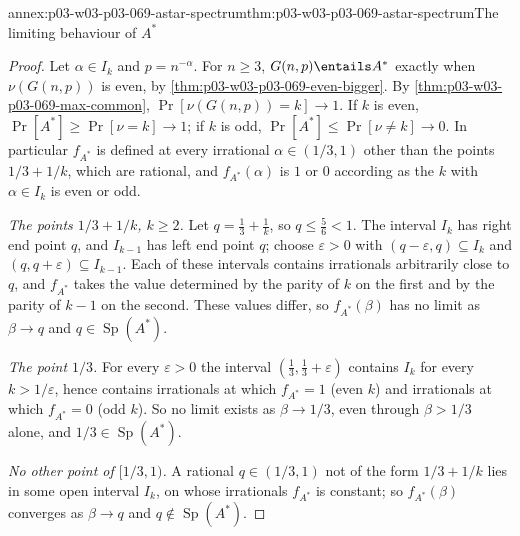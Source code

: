 \begin{annexitem}{annex:p03-w03-p03-069-astar-spectrum}{thm:p03-w03-p03-069-astar-spectrum}{The limiting behaviour of \(A^*\)}
\begin{proof}
Let \(\alpha\in I_k\) and \(p=n^{-\alpha}\).  For \(n\geq3\),
\(G(n,p)\entails A^*\) exactly when \(\nu(G(n,p))\) is even, by
\cref{thm:p03-w03-p03-069-even-bigger}.  By
\cref{thm:p03-w03-p03-069-max-common}, \(\Pr[\nu(G(n,p))=k]\to1\).  If \(k\) is
even, \(\Pr[A^*]\geq\Pr[\nu=k]\to1\); if \(k\) is odd,
\(\Pr[A^*]\leq\Pr[\nu\neq k]\to0\).  In particular \(f_{A^*}\) is defined at
every irrational \(\alpha\in(1/3,1)\) other than the points \(1/3+1/k\), which
are rational, and \(f_{A^*}(\alpha)\) is \(1\) or \(0\) according as the
\(k\) with \(\alpha\in I_k\) is even or odd.

\emph{The points \(1/3+1/k\), \(k\geq2\).}  Let \(q=\tfrac13+\tfrac1k\), so
\(q\leq\tfrac56<1\).  The interval \(I_k\) has right end point \(q\), and
\(I_{k-1}\) has left end point \(q\); choose \(\varepsilon>0\) with
\((q-\varepsilon,q)\subseteq I_k\) and \((q,q+\varepsilon)\subseteq I_{k-1}\).
Each of these intervals contains irrationals arbitrarily close to \(q\), and
\(f_{A^*}\) takes the value determined by the parity of \(k\) on the first
and by the parity of \(k-1\) on the second.  These values differ, so
\(f_{A^*}(\beta)\) has no limit as \(\beta\to q\) and \(q\in\operatorname{Sp}(A^*)\).

\emph{The point \(1/3\).}  For every \(\varepsilon>0\) the interval
\((\tfrac13,\tfrac13+\varepsilon)\) contains \(I_k\) for every
\(k>1/\varepsilon\), hence contains irrationals at which \(f_{A^*}=1\) (even
\(k\)) and irrationals at which \(f_{A^*}=0\) (odd \(k\)).  So no limit exists
as \(\beta\to1/3\), even through \(\beta>1/3\) alone, and
\(1/3\in\operatorname{Sp}(A^*)\).

\emph{No other point of \([1/3,1)\).}  A rational \(q\in(1/3,1)\) not of the
form \(1/3+1/k\) lies in some open interval \(I_k\), on whose irrationals
\(f_{A^*}\) is constant; so \(f_{A^*}(\beta)\) converges as \(\beta\to q\) and
\(q\notin\operatorname{Sp}(A^*)\).
\end{proof}
\end{annexitem}

